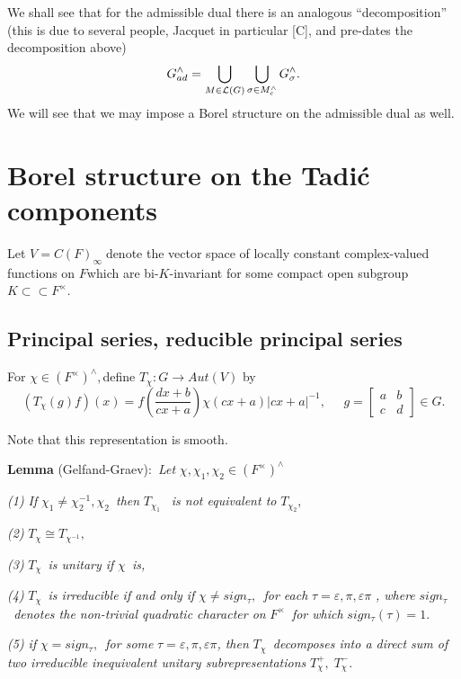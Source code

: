We shall see that for the admissible dual there is an analogous
``decomposition'' (this is due to several people, Jacquet in particular [C],
and pre-dates the decomposition above) 
\[
G_{ad}^{\wedge }=\bigcup_{M\in {\cal L}(G)}
\bigcup_{\sigma \in M_c^{\wedge}}G_\sigma ^{\wedge }. 
\]
We will see that we may impose a Borel structure on the admissible dual as
well.

\section{Borel structure on the Tadi\'c components}

Let $V=C(F)_\infty \;$denote the vector space of locally constant
complex-valued functions on $F$which are bi-$K$-invariant for some compact
open subgroup $K\subset \subset F^{\times }.$

\subsection{Principal series, reducible principal series}

For $\chi \in (F^{\times })^{\wedge },$define $T_\chi :G\rightarrow Aut(V)$
by 
\[
(T_\chi (g)f)(x)=f(\frac{dx+b}{cx+a})\chi
(cx+a)|cx+a|^{-1},\;\;\;\;\;g=\left[ 
\begin{array}{cc}
a & b \\ 
c & d
\end{array}
\right] \in G. 
\]

Note that this representation is smooth.

{\bf Lemma} (Gelfand-Graev):{\em \ Let }$\chi ,\chi _1,\chi _2\in (F^{\times
})^{\wedge }$

{\em (1) If }$\chi _1\neq \chi _2^{-1},\chi _2${\em \ then }$T_{\chi _1}$%
{\em \ is not equivalent to }$T_{\chi _2},$

{\em (2) }$T_\chi \cong T_{\chi ^{-1}},$

{\em (3) }$T_\chi ${\em \ is unitary if }$\chi ${\em \ is,}

{\em (4) }$T_\chi ${\em \ is irreducible if and only if }$\chi \neq
sign_\tau ,${\em \ for each }$\tau =\varepsilon ,\pi ,\varepsilon \pi ${\em %
, where }$sign_\tau ${\em \ denotes the non-trivial quadratic character on }$%
F^{\times }${\em \ for which }$sign_\tau (\tau )=1.$

{\em (5) if }$\chi =sign_\tau ,${\em \ for some }$\tau =\varepsilon ,\pi
,\varepsilon \pi ${\em , then }$T_\chi ${\em \ decomposes into a direct sum
of two irreducible inequivalent unitary subrepresentations }$T_\chi
^{+},\;T_\chi ^{-}.$

